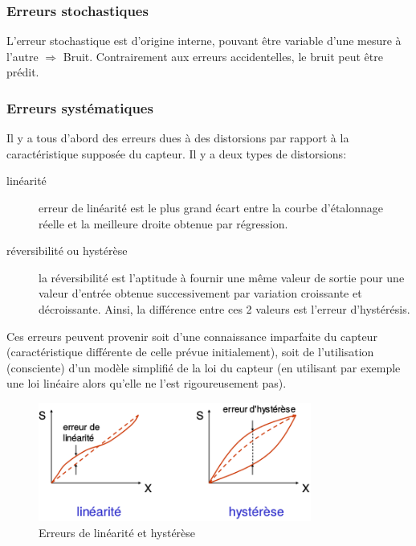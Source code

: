 \subsubsection{Erreurs stochastiques}
L'erreur stochastique est d'origine interne, pouvant être variable d'une mesure à l'autre \(\Rightarrow\) Bruit. Contrairement aux erreurs accidentelles, le bruit peut être prédit.
\subsubsection{Erreurs systématiques}
Il y a tous d'abord des erreurs dues à des distorsions par rapport à la caractéristique supposée du capteur. Il y a deux types de distorsions:
\begin{description}
	\item[linéarité] erreur de linéarité est le plus grand écart entre la courbe d'étalonnage réelle et la meilleure droite obtenue par régression.
	\item[réversibilité \textnormal{ou} hystérèse] la réversibilité est l'aptitude à fournir une même valeur de sortie pour une valeur d'entrée obtenue successivement par variation croissante et décroissante. Ainsi, la différence entre ces 2 valeurs est l'erreur d'hystérésis.
\end{description}
Ces erreurs peuvent provenir soit d'une connaissance imparfaite du capteur (caractéristique différente de celle prévue initialement), soit de l'utilisation (consciente) d'un modèle simplifié de la loi du capteur (en utilisant par exemple une loi linéaire alors qu'elle ne l'est rigoureusement pas).
\begin{figure}[H]
	\centering 
	\includegraphics[width=0.8\textwidth,height=10\baselineskip,keepaspectratio]{ch2/image6}
	\caption{Erreurs de linéarité et hystérèse}
\end{figure}

